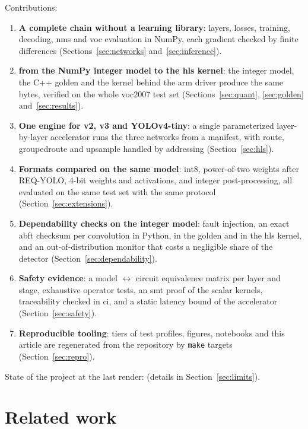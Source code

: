 \documentclass[11pt,a4paper]{article}
\begin{document}
Contributions:
\begin{enumerate}
\item \textbf{A complete chain without a learning library}: layers, losses, training,
  decoding, \gls{nms} and \gls{voc} evaluation in NumPy, each gradient checked by finite differences
  (Sections~\ref{sec:networks} and~\ref{sec:inference}).
\item \textbf{ from the NumPy integer model to the \gls{hls} kernel}: the integer
  model, the C++ \gls{golden} and the  kernel behind the \gls{arm} driver produce the
  same bytes, verified on the whole \gls{voc}2007 test set (Sections~\ref{sec:quant},
  \ref{sec:golden} and~\ref{sec:results}).
\item \textbf{One engine for v2, v3 and YOLOv4-tiny}: a single parameterized
  layer-by-layer accelerator runs the three networks from a \gls{manifest}, with route,
  \gls{groupedroute} and \gls{upsample} handled by addressing (Section~\ref{sec:hls}).
\item \textbf{Formats compared on the same model}: \gls{int8}, power-of-two weights after
  REQ-YOLO, 4-bit weights and activations, and integer post-processing, all evaluated on
  the same test set with the same protocol (Section~\ref{sec:extensions}).
\item \textbf{Dependability checks on the integer model}: fault injection, an exact \gls{abft}
  checksum per convolution in Python, in the \gls{golden} and in the \gls{hls} kernel, and an
  out-of-distribution monitor that costs a negligible share of the detector
  (Section~\ref{sec:dependability}).
\item \textbf{Safety evidence}: a model $\leftrightarrow$ circuit equivalence matrix per
  layer and stage, exhaustive operator tests, an \gls{smt} proof of the scalar kernels,
  traceability checked in \gls{ci}, and a static latency bound of the accelerator
  (Section~\ref{sec:safety}).
\item \textbf{Reproducible tooling}: \glspl{tier} of test profiles, figures, notebooks and this
  article are regenerated from the repository by \texttt{make} targets
  (Section~\ref{sec:repro}).
\end{enumerate}

State of the project at the last render: \articleetatresume{} (details in
Section~\ref{sec:limits}).

\section{Related work}\label{sec:related}
\end{document}
